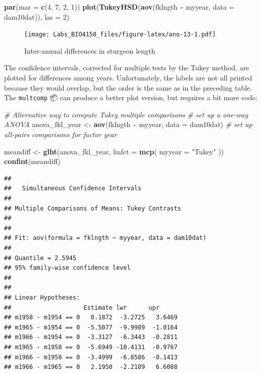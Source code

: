 \documentclass[
  12pt,
]{book}
\newenvironment{Shaded}{\begin{snugshade}}{\end{snugshade}}
\newcommand{\CommentTok}[1]{\textcolor[rgb]{0.56,0.35,0.01}{\textit{#1}}}
\newcommand{\DataTypeTok}[1]{\textcolor[rgb]{0.13,0.29,0.53}{#1}}
\newcommand{\DecValTok}[1]{\textcolor[rgb]{0.00,0.00,0.81}{#1}}
\newcommand{\KeywordTok}[1]{\textcolor[rgb]{0.13,0.29,0.53}{\textbf{#1}}}
\newcommand{\NormalTok}[1]{#1}
\newcommand{\OperatorTok}[1]{\textcolor[rgb]{0.81,0.36,0.00}{\textbf{#1}}}
\newcommand{\StringTok}[1]{\textcolor[rgb]{0.31,0.60,0.02}{#1}}
\begin{document}
\begin{Shaded}
\begin{Highlighting}[]
\KeywordTok{par}\NormalTok{(}\DataTypeTok{mar =} \KeywordTok{c}\NormalTok{(}\DecValTok{4}\NormalTok{, }\DecValTok{7}\NormalTok{, }\DecValTok{2}\NormalTok{, }\DecValTok{1}\NormalTok{))}
\KeywordTok{plot}\NormalTok{(}\KeywordTok{TukeyHSD}\NormalTok{(}\KeywordTok{aov}\NormalTok{(fklngth }\OperatorTok{\textasciitilde{}}\StringTok{ }\NormalTok{myyear, }\DataTypeTok{data =}\NormalTok{ dam10dat)), }\DataTypeTok{las =} \DecValTok{2}\NormalTok{)}
\end{Highlighting}
\end{Shaded}

\begin{figure}
\centering
\texttt{[image: Labs\_BIO4158\_files/figure-latex/ano-13-1.pdf]}
\caption{\label{fig:ano-13}Inter-annual differences in sturgeon length}
\end{figure}

The confidence intervals, corrected for multiple tests by the Tukey method, are plotted for differences among years. Unfortunately, the labels are not all printed because they would overlap, but the order is the same as in the preceding table. The \texttt{multcomp} 📦 can produce a better plot version, but requires a bit more code:

\begin{Shaded}
\begin{Highlighting}[]
\CommentTok{\# Alternative way to compute Tukey multiple comparisons}
\CommentTok{\# set up a one{-}way ANOVA}
\NormalTok{anova\_fkl\_year \textless{}{-}}\StringTok{ }\KeywordTok{aov}\NormalTok{(fklngth }\OperatorTok{\textasciitilde{}}\StringTok{ }\NormalTok{myyear, }\DataTypeTok{data =}\NormalTok{ dam10dat)}
\CommentTok{\# set up all{-}pairs comparisons for factor \textasciigrave{}year\textquotesingle{}}

\NormalTok{meandiff \textless{}{-}}\StringTok{ }\KeywordTok{glht}\NormalTok{(anova\_fkl\_year, }\DataTypeTok{linfct =} \KeywordTok{mcp}\NormalTok{(}
  \DataTypeTok{myyear =}
    \StringTok{"Tukey"}
\NormalTok{))}
\KeywordTok{confint}\NormalTok{(meandiff)}
\end{Highlighting}
\end{Shaded}

\begin{verbatim}
## 
##   Simultaneous Confidence Intervals
## 
## Multiple Comparisons of Means: Tukey Contrasts
## 
## 
## Fit: aov(formula = fklngth ~ myyear, data = dam10dat)
## 
## Quantile = 2.5945
## 95% family-wise confidence level
##  
## 
## Linear Hypotheses:
##                    Estimate lwr      upr     
## m1958 - m1954 == 0   0.1872  -3.2725   3.6469
## m1965 - m1954 == 0  -5.5077  -9.9989  -1.0164
## m1966 - m1954 == 0  -3.3127  -6.3443  -0.2811
## m1965 - m1958 == 0  -5.6949 -10.4131  -0.9767
## m1966 - m1958 == 0  -3.4999  -6.8586  -0.1413
## m1966 - m1965 == 0   2.1950  -2.2189   6.6088
\end{verbatim}
\end{document}

